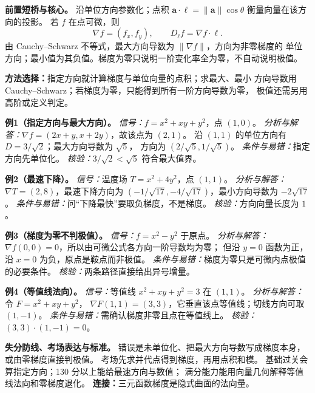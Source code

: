 
\begin{knowledgeBox}
\textbf{前置短桥与核心。}
沿单位方向参数化；点积
\(\boldsymbol a\cdot\boldsymbol\ell
=\|\boldsymbol a\|\cos\theta\) 衡量向量在该方向的投影。
若 \(f\) 在点可微，则
\[
\nabla f=(f_x,f_y),\qquad
D_{\boldsymbol\ell}f=\nabla f\cdot\boldsymbol\ell.
\]
由 Cauchy--Schwarz 不等式，最大方向导数为 \(\|\nabla f\|\)，方向为非零梯度的
单位方向；最小值为其负值。梯度为零只说明一阶变化率全为零，不自动说明极值。

\textbf{方法选择：}指定方向就计算梯度与单位向量的点积；求最大、最小
方向导数用 Cauchy--Schwarz；若梯度为零，只能得到所有一阶方向导数为零，
极值还需另用高阶或定义判定。

\textbf{例1（指定方向与最大方向）。}
\emph{信号：}\(f=x^2+xy+y^2\)，点 \((1,0)\)。
\emph{分析与解答：}\(\nabla f=(2x+y,x+2y)\)，故该点为 \((2,1)\)。
沿 \((1,1)\) 的单位方向有 \(D=3/\sqrt2\)；最大方向导数为 \(\sqrt5\)，
方向为 \((2/\sqrt5,1/\sqrt5)\)。
\emph{条件与易错：}指定方向先单位化。
\emph{核验：}\(3/\sqrt2<\sqrt5\) 符合最大值界。

\textbf{例2（最速下降）。}
\emph{信号：}温度场 \(T=x^2+4y^2\)，点 \((1,1)\)。
\emph{分析与解答：}\(\nabla T=(2,8)\)，最速下降方向为
\((-1/\sqrt{17},-4/\sqrt{17})\)，最小方向导数为 \(-2\sqrt{17}\)。
\emph{条件与易错：}问“下降最快”要取负梯度，不是梯度。
\emph{核验：}方向向量长度为 \(1\)。

\textbf{例3（梯度为零不判极值）。}
\emph{信号：}\(f=x^2-y^2\) 于原点。
\emph{分析与解答：}\(\nabla f(0,0)=0\)，所以由可微公式各方向一阶导数均为零；
但沿 \(y=0\) 函数为正，沿 \(x=0\) 为负，原点是鞍点而非极值。
\emph{条件与易错：}梯度为零只是可微内点极值的必要条件。
\emph{核验：}两条路径直接给出异号增量。

\textbf{例4（等值线法向）。}
\emph{信号：}等值线 \(x^2+xy+y^2=3\) 在 \((1,1)\)。
\emph{分析与解答：}令 \(F=x^2+xy+y^2\)，
\(\nabla F(1,1)=(3,3)\)，它垂直该点等值线；切线方向可取 \((1,-1)\)。
\emph{条件与易错：}需确认梯度非零且点在等值线上。
\emph{核验：}\((3,3)\cdot(1,-1)=0\)。

\textbf{失分防线、考场表达与标准。}
错误是未单位化、把最大方向导数写成梯度本身，或由零梯度直接判极值。
考场先求并代点得到梯度，再用点积和模。
基础过关会算指定方向；130 分以上能给最速方向与数值；
满分能力能用向量几何解释等值线法向和零梯度退化。
\textbf{连接：}三元函数梯度是隐式曲面的法向量。
\end{knowledgeBox}

